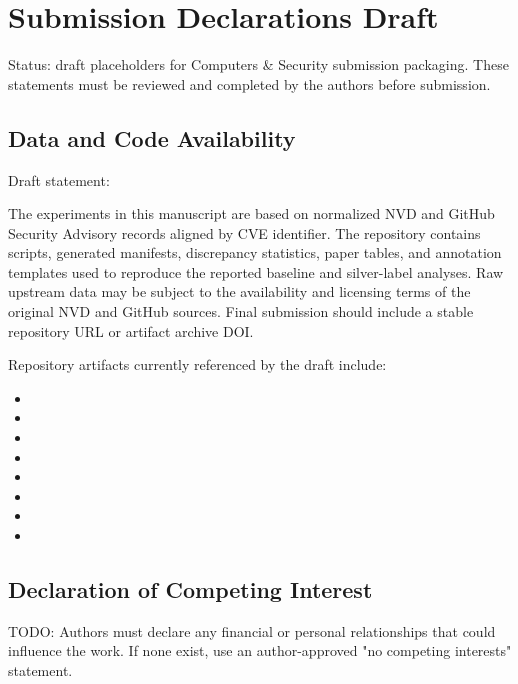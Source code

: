 \section*{Submission Declarations Draft}

Status: draft placeholders for Computers \& Security submission packaging. These statements must be reviewed and completed by the authors before submission.

\subsection{Data and Code Availability}

Draft statement:

The experiments in this manuscript are based on normalized NVD and GitHub Security Advisory records aligned by CVE identifier. The repository contains scripts, generated manifests, discrepancy statistics, paper tables, and annotation templates used to reproduce the reported baseline and silver-label analyses. Raw upstream data may be subject to the availability and licensing terms of the original NVD and GitHub sources. Final submission should include a stable repository URL or artifact archive DOI.

Repository artifacts currently referenced by the draft include:

\begin{itemize}
\item {}
\item {}
\item {}
\item {}
\item {}
\item {}
\item {}
\item {}
\end{itemize}

\subsection{Declaration of Competing Interest}

TODO: Authors must declare any financial or personal relationships that could influence the work. If none exist, use an author-approved "no competing interests" statement.

